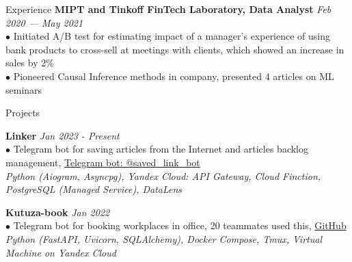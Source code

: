 \documentclass{resume} %
\begin{document}
\begin{rSection}{ Experience }
    { \bf MIPT and Tinkoff FinTech Laboratory, Data Analyst } \hfill {\em Feb 2020 — May 2021}\\
    { $\bullet$ Initiated A/B test for estimating impact of a manager's experience of using bank products to cross-sell at meetings with clients, which showed an increase in sales by 2\% }\\
    { $\bullet$ Pioneered Causal Inference methods in company, presented 4 articles on ML seminars }

\end{rSection}

\begin{rSection}{ Projects }

    { \bf Linker} \hfill {\em Jan 2023 - Present}\\
    { $\bullet$ Telegram bot for saving articles from the Internet and articles backlog management, \href{https://t.me/saved_link_bot}{Telegram bot: @saved\_link\_bot}}\\
    { \it Python (Aiogram, Asyncpg), Yandex Cloud: API Gateway, Cloud Finction, PostgreSQL (Managed Service), DataLens}

    { \bf Kutuza-book} \hfill {\em Jan 2022}\\
    { $\bullet$ Telegram bot for booking workplaces in office, 20 teammates used this, \href{https://github.com/YHx07/Kutuza-book}{GitHub}}\\
    { \it Python (FastAPI, Uvicorn, SQLAlchemy), Docker Compose, Tmux, Virtual Machine on Yandex Cloud }
    
\end{rSection}
\end{document}

